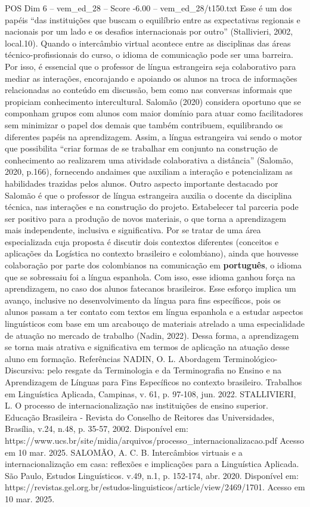 \begin{textsample}{POS Dim 6 – vem\_ed\_28 – Score -6.00 – vem\_ed\_28/t150.txt}
Esse é um dos papéis “das instituições que buscam o equilíbrio entre as expectativas regionais e nacionais por um lado e os desafios internacionais por outro” (Stallivieri, 2002, local.10).
Quando o intercâmbio virtual acontece entre as disciplinas das áreas técnico-profissionais do curso, o idioma de comunicação pode ser uma barreira.
Por isso, é essencial que o professor de língua estrangeira seja colaborativo para mediar as interações, encorajando e apoiando os alunos na troca de informações relacionadas ao conteúdo em discussão, bem como nas conversas informais que propiciam conhecimento intercultural.
Salomão (2020) considera oportuno que se componham grupos com alunos com maior domínio para atuar como facilitadores sem minimizar o papel dos demais que também contribuem, equilibrando os diferentes papéis na aprendizagem.
Assim, a língua estrangeira vai sendo o motor que possibilita “criar formas de se trabalhar em conjunto na construção de conhecimento ao realizarem uma atividade colaborativa a distância” (Salomão, 2020, p.166), fornecendo andaimes que auxiliam a interação e potencializam as habilidades trazidas pelos alunos.
Outro aspecto importante destacado por Salomão é que o professor de língua estrangeira auxilia o docente da disciplina técnica, nas interações e na construção do projeto.
Estabelecer tal parceria pode ser positivo para a produção de novos materiais, o que torna a aprendizagem mais independente, inclusiva e significativa.
Por se tratar de uma área especializada cuja proposta é discutir dois contextos diferentes (conceitos e aplicações da Logística no contexto brasileiro e colombiano), ainda que houvesse colaboração por parte dos colombianos na comunicação em \textbf{português}, o idioma que se sobressaiu foi a língua espanhola.
Com isso, esse idioma ganhou força na aprendizagem, no caso dos alunos fatecanos brasileiros.
Esse esforço implica um avanço, inclusive no desenvolvimento da língua para fins específicos, pois os alunos passam a ter contato com textos em língua espanhola e a estudar aspectos linguísticos com base em um arcabouço de materiais atrelado a uma especialidade de atuação no mercado de trabalho (Nadin, 2022).
Dessa forma, a aprendizagem se torna mais atrativa e significativa em termos de aplicação na atuação desse aluno em formação.
Referências NADIN, O.
L.
Abordagem Terminológico-Discursiva: pelo resgate da Terminologia e da Terminografia no Ensino e na Aprendizagem de Línguas para Fins Específicos no contexto brasileiro.
Trabalhos em Linguística Aplicada, Campinas, v. 61, p. 97-108, jun. 2022.
STALLIVIERI, L.
O processo de internacionalização nas instituições de ensino superior.
Educação Brasileira - Revista do Conselho de Reitores das Universidades, Brasília, v.24, n.48, p. 35-57, 2002.
Disponível em: https://www.ucs.br/site/midia/arquivos/processo\_internacionalizacao.pdf Acesso em 10 mar. 2025.
SALOMÃO, A.
C.
B.
Intercâmbios virtuais e a internacionalização em casa: reflexões e implicações para a Linguística Aplicada.
São Paulo, Estudos Linguísticos. v.49, n.1, p. 152-174, abr. 2020.
Disponível em: https://revistas.gel.org.br/estudos-linguisticos/article/view/2469/1701.
Acesso em 10 mar. 2025.

\end{textsample}
